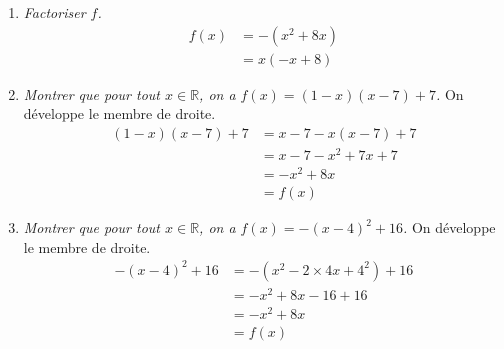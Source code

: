 \documentclass[12pt]{article}
\begin{document}
\begin{exercice}
\begin{enumerate}
            \begin{center}
          \end{center}
    \item \emph{Factoriser $f$.}
          \begin{align*}
            f\left(x\right) &= -\left(x^2+8x\right)\\
                            &= x\left(-x+8\right)
          \end{align*}
        \item \emph{Montrer que pour tout $x\in\mathbb{R}$, on a $f(x)=(1-x)(x-7)+7$.} On développe le membre de droite.
          \begin{align*}
            (1-x)(x-7)+7 &= x -7-x(x-7)+7\\
                         &= x-7-x^2+7x+7\\
                         &= -x^2+8x\\
                         &= f(x)
          \end{align*}
        \item \emph{Montrer que pour tout $x\in\mathbb{R}$, on a $f(x)=-(x-4)^2+16$.} On développe le membre de droite.
          \begin{align*}
            -(x-4)^2+16 &= -\left(x^2-2\times4x+4^2\right)+16\\
                       &= -x^2+8x-16+16\\
                       &= -x^2+8x\\
                       &= f(x)

\end{align*}
\end{enumerate}
\end{exercice}
\end{document}
